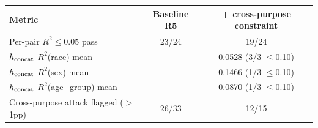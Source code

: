 \begin{tabular}{lcc}
\toprule
Metric & Baseline R5 & + cross-purpose constraint \\
\midrule
Per-pair $R^2 \le 0.05$ pass & 23/24 & 19/24 \\
$h_{\rm concat}$ $R^2$(race) mean & --- & 0.0528 (3/3 $\le$0.10) \\
$h_{\rm concat}$ $R^2$(sex) mean & --- & 0.1466 (1/3 $\le$0.10) \\
$h_{\rm concat}$ $R^2$(age\_group) mean & --- & 0.0870 (1/3 $\le$0.10) \\
Cross-purpose attack flagged ($>$1pp) & 26/33 & 12/15 \\
\bottomrule
\end{tabular}
